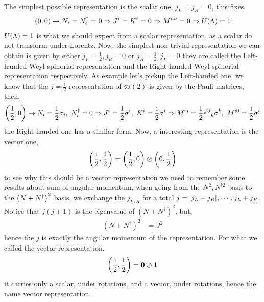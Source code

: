 The simplest possible representation is the scalar one, $j_L=j_R=0$, this fixes,
\begin{align}
    \qty(0,0)\rightarrow N_ i= N_i^\dagger =0 \Rightarrow J^i=K^i =0\Rightarrow M^{\mu\nu}=0\Rightarrow U\qty(\Lambda) = 1
\end{align}
$U\qty(\Lambda)=1$ is what we should expect from a scalar representation, as a scalar do not transform under Lorentz. Now, the simplest non trivial 
representation we can obtain is given by either $j_L=\frac12, j_R=0$ or $j_R=\frac12, j_L=0$ they are called the Left-handed Weyl spinorial representation 
and the Right-handed Weyl spinorial representation respectively. As example let's pickup the Left-handed one, we know that the $j=\frac12$ representation of 
$\mathfrak {su}(2)$ is given by the Pauli matrices, then,
\begin{align}
    \qty(\frac12,0)\rightarrow N_ i=\frac12\sigma_i,\  N_i^\dagger =0 \Rightarrow J^i=\frac12 \sigma^i,\ K^i =\frac\im 2\sigma^i\Rightarrow M^{ij}=\frac12 \tensor{\epsilon}{^i^j_k}\sigma^k,\ M^{i0}=\frac\im2\sigma^i
\end{align}
the Right-handed one has a similar form. Now, a interesting representation is the vector one,
\begin{align}
    \qty(\frac12,\frac12)=\qty(\frac12,0)\otimes\qty(0,\frac12)
\end{align}
to see why this should be a vector representation we need to remember some results about sum of angular momentum, when going from the $N^2, N^{\dagger2}$ basis to the 
$\qty(N+N^\dagger)^2$ basis, we exchange the $j_{L/R}$ for a total $j=\abs{j_L -j_R},\cdots, j_L+j_R$. Notice that $j(j+1)$ is the eigenvalue of $(N+N^\dagger)^2$, but, 
\begin{align}
    (N+N^\dagger)^2&=J^2
\end{align}
hence the $j$ is exactly the angular momentum of the representation. For what we called the vector representation,
\begin{align}
    \qty(\frac12,\frac12)=\vb 0\oplus \vb 1
\end{align}
it carries only a scalar, under rotations, and a vector, under rotations, hence the name vector representation.